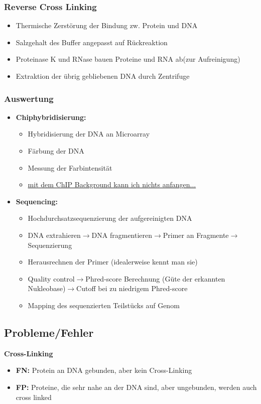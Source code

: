 \subsubsection{Reverse Cross Linking}
\begin{itemize}
	\item Thermische Zerstörung der Bindung zw. Protein und DNA
	\item Salzgehalt des Buffer angepasst auf Rückreaktion
	\item Proteinase K und RNase bauen Proteine und RNA ab(zur Aufreinigung)
	\item Extraktion der übrig gebliebenen DNA durch Zentrifuge
\end{itemize}

\subsubsection{Auswertung}
\begin{itemize}
	\item \textbf{Chiphybridisierung:}
		\begin{itemize}
			\item Hybridisierung der DNA an Microarray
			\item Färbung der DNA
			\item Messung der Farbintensität
			\item \underline{mit dem ChIP Background kann ich nichts anfangen...}
		\end{itemize}
	\item \textbf{Sequencing:}
		\begin{itemize}
			\item Hochdurchsatzsequenzierung der aufgereinigten DNA
			\item DNA extrahieren$\rightarrow$DNA fragmentieren$\rightarrow$Primer an Fragmente$\rightarrow$Sequenzierung
			\item Herausrechnen der Primer (idealerweise kennt man sie)
			\item Quality control$\rightarrow$Phred-score Berechnung (Güte der erkannten Nukleobase)$\rightarrow$Cutoff bei zu niedrigem Phred-score
			\item Mapping des sequenzierten Teilstücks auf Genom
		\end{itemize}
\end{itemize}

\subsection{Probleme/Fehler}
\textbf{Cross-Linking}
\begin{itemize}
	\item \textbf{FN:} Protein an DNA gebunden, aber kein Cross-Linking
	\item \textbf{FP:} Proteine, die sehr nahe an der DNA sind, aber ungebunden, werden auch cross linked
\end{itemize}

